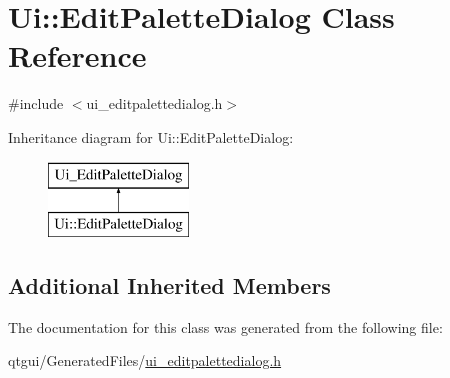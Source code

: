 \hypertarget{class_ui_1_1_edit_palette_dialog}{}\section{Ui\+::Edit\+Palette\+Dialog Class Reference}
\label{class_ui_1_1_edit_palette_dialog}


{\ttfamily \#include $<$ui\+\_\+editpalettedialog.\+h$>$}

Inheritance diagram for Ui\+::Edit\+Palette\+Dialog\+:\begin{figure}[H]
\begin{center}
\leavevmode
\includegraphics[height=2.000000cm]{dc/d80/class_ui_1_1_edit_palette_dialog}
\end{center}
\end{figure}
\subsection*{Additional Inherited Members}


The documentation for this class was generated from the following file\+:\begin{DoxyCompactItemize}
\item 
qtgui/\+Generated\+Files/\mbox{\hyperlink{ui__editpalettedialog_8h}{ui\+\_\+editpalettedialog.\+h}}\end{DoxyCompactItemize}
